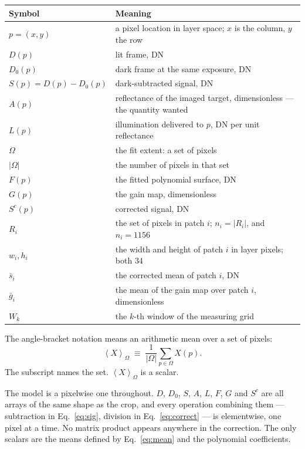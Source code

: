 \documentclass[11pt, a4paper]{article}
\newcommand{\mean}[2]{\left\langle #1 \right\rangle_{#2}}
\begin{document}
\begin{center}
\begin{tabular}{ll}
\toprule
Symbol & Meaning \\
\midrule
$p=(x,y)$ & a pixel location in layer space; $x$ is the column, $y$ the row \\
$D(p)$    & lit frame, DN \\
$D_0(p)$  & dark frame at the same exposure, DN \\
$S(p) = D(p)-D_0(p)$ & dark-subtracted signal, DN \\
$A(p)$    & reflectance of the imaged target, dimensionless --- the quantity wanted \\
$L(p)$    & illumination delivered to $p$, DN per unit reflectance \\
$\Omega$  & the fit extent: a set of pixels \\
$|\Omega|$& the number of pixels in that set \\
$F(p)$    & the fitted polynomial surface, DN \\
$G(p)$    & the gain map, dimensionless \\
$S^{c}(p)$& corrected signal, DN \\
$R_i$     & the set of pixels in patch $i$; $n_i = |R_i|$, and $n_i = 1156$ \\
$w_i,h_i$ & the width and height of patch $i$ in layer pixels; both $34$ \\
$\bar{s}_i$ & the corrected mean of patch $i$, DN \\
$\bar{g}_i$ & the mean of the gain map over patch $i$, dimensionless \\
$W_k$     & the $k$-th window of the measuring grid \\
\bottomrule
\end{tabular}
\end{center}

The angle-bracket notation means an arithmetic mean over a set of pixels:
\begin{equation}
  \mean{X}{\Omega} \;\equiv\; \frac{1}{|\Omega|}\sum_{p \in \Omega} X(p) .
  \label{eq:mean}
\end{equation}
The subscript names the set.
$\mean{X}{\Omega}$ is a scalar.

The model is a pixelwise one throughout.
$D$, $D_0$, $S$, $A$, $L$, $F$, $G$ and $S^{c}$ are all arrays
of the same shape as the crop,
and every operation combining them --- subtraction in
Eq.~\ref{eq:sig}, division in Eq.~\ref{eq:correct} ---
is elementwise, one pixel at a time.
No matrix product appears anywhere in the correction.
The only scalars are the means defined by Eq.~\ref{eq:mean}
and the polynomial coefficients.
\end{document}
